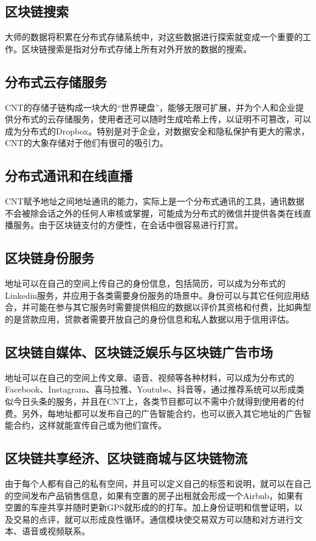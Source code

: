 \documentclass[a4paper,12pt]{article}
\begin{document}
\subsection{区块链搜索}

大师的数据将积累在分布式存储系统中，对这些数据进行探索就变成一个重要的工作。区块链搜索是指对分布式存储上所有对外开放的数据的搜索。

\subsection{分布式云存储服务}
CNT的存储子链构成一块大的“世界硬盘”，能够无限可扩展，并为个人和企业提供分布式的云存储服务，使用者还可以随时生成哈希上传，以证明不可篡改，可以成为分布式的Dropbox。特别是对于企业，对数据安全和隐私保护有更大的需求，CNT的大象存储对于他们有很可的吸引力。

\subsection{分布式通讯和在线直播}
CNT赋予地址之间地址通讯的能力，实际上是一个分布式通讯的工具，通讯数据不会被除会话之外的任何人审核或掌握，可能成为分布式的微信并提供各类在线直播服务。由于区块链支付的方便性，在会话中很容易进行打赏。

\subsection{区块链身份服务}
地址可以在自己的空间上传自己的身份信息，包括简历，可以成为分布式的Linkedin服务，并应用于各类需要身份服务的场景中。身份可以与其它任何应用结合，并可能在参与其它服务时需要提供相应的数据以评价其资格和付费，比如典型的是贷款应用，贷款者需要开放自己的身份信息和私人数据以用于信用评估。

\subsection{区块链自媒体、区块链泛娱乐与区块链广告市场}
地址可以在自己的空间上传文章、语音、视频等各种材料，可以成为分布式的Facebook、Instagram、喜马拉雅、Youtube、抖音等，通过推荐系统可以形成类似今日头条的服务，并且在CNT上，各类节目都可以不需中介就得到使用者的付费。另外，每地址都可以发布自己的广告智能合约，也可以嵌入其它地址的广告智能合约，这样就能宣传自己或为他们宣传。

\subsection{区块链共享经济、区块链商城与区块链物流}
由于每个人都有自己的私有空间，并且可以定义自己的标签和说明，就可以在自己的空间发布产品销售信息，如果有空置的房子出租就会形成一个Airbnb，如果有空置的车座共享并随时更新GPS就形成的的打车。加上身份证明和信誉证明，以及交易的点评，就可以形成良性循环。通信模块使交易双方可以随和对方进行文本、语音或视频联系。
\end{document}
